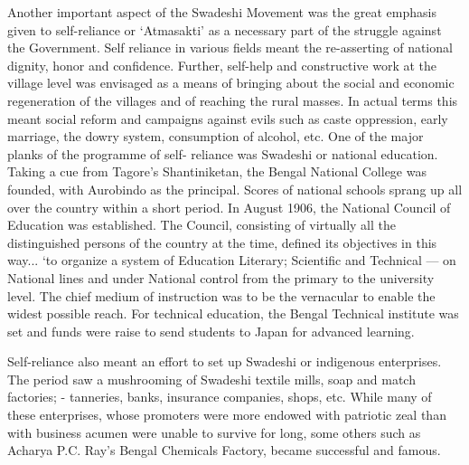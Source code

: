 Another important aspect of the Swadeshi Movement was the great emphasis given to self-reliance or `Atmasakti' as a necessary part of the struggle against the Government. Self reliance in various fields meant the re-asserting of national dignity, honor and confidence. Further, self-help and constructive work at the village level was envisaged as a means of bringing about the social and economic regeneration of the villages and of reaching the rural masses. In actual terms this meant social reform and campaigns against evils such as caste oppression, early marriage, the dowry system, consumption of alcohol, etc. One of the major planks of the programme of self- reliance was Swadeshi or national education. Taking a cue from Tagore's Shantiniketan, the Bengal National College was founded, with Aurobindo as the principal. Scores of national schools sprang up all over the country within a short period. In August 1906, the National Council of Education was established. The Council, consisting of virtually all the distinguished persons of the country at the time, defined its objectives in this way... `to organize a system of Education Literary; Scientific and Technical — on National lines and under National control from the primary to the university level. The chief medium of instruction was to be the vernacular to enable the widest possible reach. For technical education, the Bengal Technical institute was set and funds were raise to send students to Japan for advanced learning.

Self-reliance also meant an effort to set up Swadeshi or indigenous enterprises. The period saw a mushrooming of Swadeshi textile mills, soap and match factories; - tanneries, banks, insurance companies, shops, etc. While many of these enterprises, whose promoters were more endowed with patriotic zeal than with business acumen were unable to survive for long, some others such as Acharya P.C. Ray's Bengal Chemicals Factory, became successful and famous.

